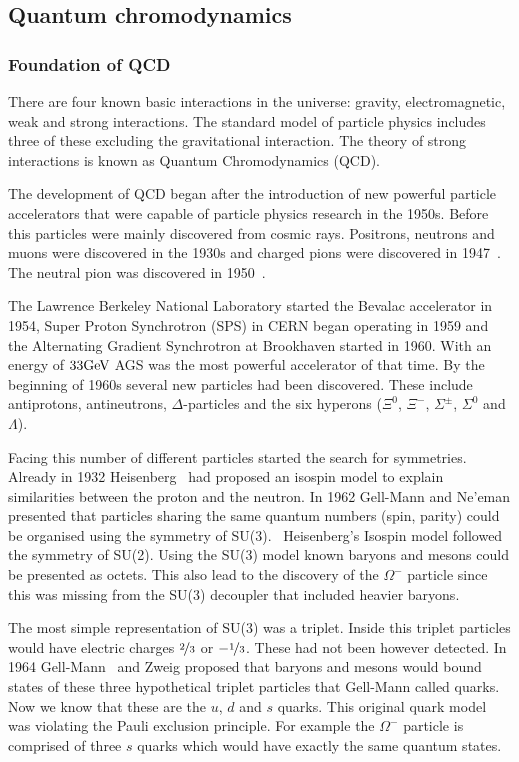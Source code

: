 \pagebreak
\subsection{Quantum chromodynamics}
\subsubsection{Foundation of QCD}
There are four known basic interactions in the universe: gravity, electromagnetic, weak and strong interactions. The standard model of particle physics includes three of these excluding the gravitational interaction. The theory of strong interactions is known as Quantum Chromodynamics (QCD).

The development of QCD began after the introduction of new powerful particle accelerators that were capable of particle physics research in the 1950s. Before this particles were mainly discovered from cosmic rays. Positrons, neutrons and muons were discovered in the 1930s and charged pions were discovered in 1947~\cite{}. The neutral pion was discovered in 1950~\cite{Bjorklund:1950}.

The Lawrence Berkeley National Laboratory started the Bevalac accelerator in 1954, Super Proton Synchrotron (SPS) in CERN began operating in 1959 and the Alternating Gradient Synchrotron at Brookhaven started in 1960. With an energy of $33\mathrm{GeV}\kern-0.05em$ AGS was the most powerful accelerator of that time. By the beginning of 1960s several new particles had been discovered. These include antiprotons, antineutrons, $\Delta$-particles and the six hyperons ($\Xi^0$, $\Xi^-$, $\Sigma^{\pm}$, $\Sigma^0$ and $\Lambda$).

Facing this number of different particles started the search for symmetries. Already in 1932 Heisenberg~\cite{Heisenberg:1932} 
had proposed an isospin model to explain similarities between the proton and the neutron. In 1962 Gell-Mann and Ne'eman presented that particles sharing the same quantum numbers (spin, parity) could be organised using the symmetry of SU(3).~\cite{Gell-Mann:1962} Heisenberg's Isospin model followed the symmetry of SU(2). Using the SU(3) model known baryons and mesons could be presented as octets. This also lead to the discovery of the $\Omega^{-}$ particle since this was missing from the SU(3) decoupler that included heavier baryons. 

The most simple representation of SU(3) was a triplet. Inside this triplet particles would have electric charges $\nicefrac{2}{3}$ or $-\nicefrac{1}{3}$. These had not been however detected. In 1964 Gell-Mann~\cite{Gell-Mann:1964} and Zweig proposed that baryons and mesons would bound states of these three hypothetical triplet particles that Gell-Mann called quarks. Now we know that these are the $u$, $d$ and $s$ quarks. This original quark model was violating the Pauli exclusion principle. For example the $\Omega^{-}$ particle is comprised of three $s$ quarks which would have exactly the same quantum states. 

